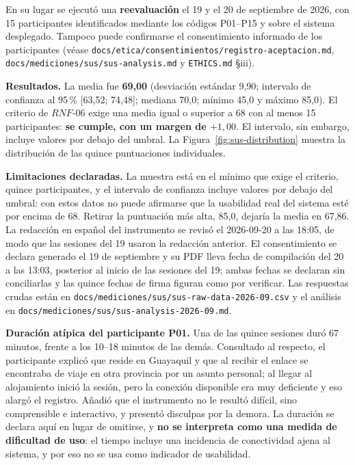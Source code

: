 \documentclass[11pt,a4paper]{report}
\begin{document}
En su lugar se ejecutó una \textbf{reevaluación} el 19 y el 20 de septiembre de 2026, con 15 participantes identificados mediante los códigos P01--P15 y sobre el sistema desplegado. Tampoco puede confirmarse el consentimiento informado de los participantes (véase \texttt{docs/etica/consentimientos/registro-aceptacion.md}, \texttt{docs/mediciones/sus/sus-analysis.md} y \texttt{ETHICS.md} \S iii).

\textbf{Resultados.} La media fue \textbf{69,00} (desviación estándar 9,90; intervalo de confianza al 95\,\% [63,52; 74,48]; mediana 70,0; mínimo 45,0 y máximo 85,0). El criterio de $RNF\text{-}06$ exige una media igual o superior a 68 con al menos 15 participantes: \textbf{se cumple, con un margen de $+1,00$}. El intervalo, sin embargo, incluye valores por debajo del umbral. La Figura~\ref{fig:sus-distribution} muestra la distribución de las quince puntuaciones individuales.

\textbf{Limitaciones declaradas.} La muestra está en el mínimo que exige el criterio, quince participantes, y el intervalo de confianza incluye valores por debajo del umbral: con estos datos no puede afirmarse que la usabilidad real del sistema esté por encima de 68. Retirar la puntuación más alta, 85,0, dejaría la media en 67,86. La redacción en español del instrumento se revisó el 2026-09-20 a las 18:05, de modo que las sesiones del 19 usaron la redacción anterior. El consentimiento se declara generado el 19 de septiembre y su PDF lleva fecha de compilación del 20 a las 13:03, posterior al inicio de las sesiones del 19; ambas fechas se declaran sin conciliarlas y las quince fechas de firma figuran como por verificar. Las respuestas crudas están en \texttt{docs/mediciones/sus/sus-raw-data-2026-09.csv} y el análisis en \texttt{docs/mediciones/sus/sus-analysis-2026-09.md}.

\textbf{Duración atípica del participante P01.} Una de las quince sesiones duró 67 minutos, frente a los 10--18 minutos de las demás. Consultado al respecto, el participante explicó que reside en Guayaquil y que al recibir el enlace se encontraba de viaje en otra provincia por un asunto personal; al llegar al alojamiento inició la sesión, pero la conexión disponible era muy deficiente y eso alargó el registro. Añadió que el instrumento no le resultó difícil, sino comprensible e interactivo, y presentó disculpas por la demora. La duración se declara aquí en lugar de omitirse, y \textbf{no se interpreta como una medida de dificultad de uso}: el tiempo incluye una incidencia de conectividad ajena al sistema, y por eso no se usa como indicador de usabilidad.
\end{document}
